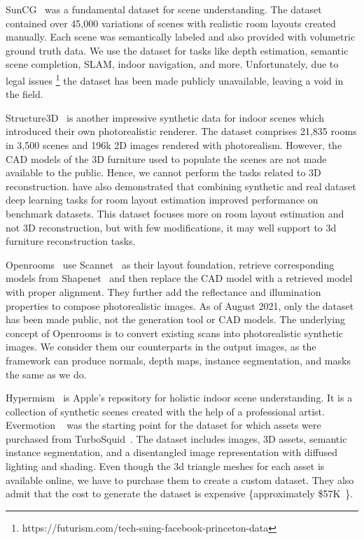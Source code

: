 SunCG~\cite{Song2017SemanticSC} was a fundamental dataset for scene understanding.
The dataset contained over 45,000 variations of scenes with realistic room layouts created manually.
Each scene was semantically labeled and also provided with volumetric ground truth data.
We use the dataset for tasks like depth estimation, semantic scene completion, SLAM, indoor navigation, and more.
Unfortunately, due to legal issues \footnote{https://futurism.com/tech-suing-facebook-princeton-data} the dataset has been made publicly unavailable, leaving a void in the field.

Structure3D~\cite{zheng2020structured3d} is another impressive synthetic data for indoor scenes which introduced their own photorealistic renderer.
The dataset comprises 21,835 rooms in 3,500 scenes and 196k 2D images rendered with photorealism.
However, the CAD models of the 3D furniture used to populate the scenes are not made available to the public.
Hence, we cannot perform the tasks related to  3D reconstruction.
\cite{zheng2020structured3d} have also demonstrated that combining synthetic and real dataset deep learning tasks for room layout estimation improved performance on benchmark datasets.
This dataset focuses more on room layout estimation and not 3D reconstruction, but with few modifications, it may well support to 3d furniture reconstruction tasks.

Openrooms~\cite{li2021openrooms} use Scannet~\cite{dai2017scannet} as their layout foundation, retrieve corresponding models from Shapenet~\cite{chang2015shapenet}
and then replace the CAD model with a retrieved model with proper alignment.
They further add the reflectance and illumination properties to compose photorealistic images.
As of August 2021, only the dataset has been made public, not the generation tool or CAD models.
The underlying concept of Openrooms is to convert existing scans into photorealistic synthetic images.
We consider them our counterparts in the output images, as the framework can produce normals, depth maps, instance segmentation, and masks the same as we do.

Hypermism~\cite{Roberts2020HypersimAP} is Apple's repository for holistic indoor scene understanding.
It is a collection of synthetic scenes created with the help of a professional artist.
Evermotion ~\cite{Evermotion} was the starting point for the dataset for which assets were purchased from TurboSquid~\cite{TurboSquid}.
The dataset includes images, 3D assets, semantic instance segmentation, and a disentangled image representation with diffused lighting and shading.
Even though the 3d triangle meshes for each asset is available online, we have to purchase them to create a custom dataset.
They also admit that the cost to generate the dataset is expensive \{approximately \$57K~\cite{Roberts2020HypersimAP}\}.

